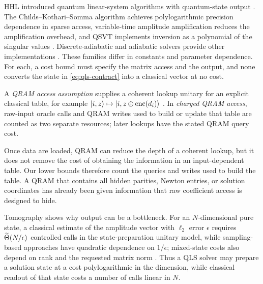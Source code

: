 HHL introduced quantum linear-system algorithms with quantum-state output
\cite{harrow2009-quantum-algorithm-linear-systems-equations}.  The
Childs--Kothari--Somma algorithm achieves polylogarithmic precision dependence
in sparse access, variable-time amplitude amplification reduces the
amplification overhead, and QSVT implements inversion as a polynomial of the
singular values
\cite{andrew2017-quantum-algorithm-systems-linear-equations,andris2012-variable-time-amplitude-amplification-quantum,andras2019-quantum-singular-value-transformation-beyond}.
Discrete-adiabatic and adiabatic solvers provide other implementations
\cite{luigi2022-optimal-scaling-quantum-linear-systems,subasi2019-adiabatic-quantum-linear-system}.
These families differ in constants and parameter dependence.  For each, a
cost bound must specify the matrix access and the output, and none converts
the state in \eqref{eq:qls-contract} into a classical vector at no cost.

\begin{definition}
\label{def:charged-qram}
A \emph{QRAM access assumption} supplies a coherent lookup unitary for an
explicit classical table, for example
$\lvert i,z\rangle\mapsto\lvert i,z\mathbin\oplus\operatorname{enc}(d_i)\rangle$
\cite{giovannetti2008-architectures-for-a-quantum-random}.
In \emph{charged QRAM access}, raw-input oracle calls and QRAM writes used to
build or update that table are counted as two separate resources; later
lookups have the stated QRAM query cost.
\end{definition}

Once data are loaded, QRAM can reduce the depth of a coherent lookup, but it
does not remove the cost of obtaining the information in an input-dependent
table.  Our lower bounds therefore count the queries and writes used to build
the table.  A QRAM that contains all hidden
parities, Newton entries, or solution coordinates has already been given
information that raw coefficient access is designed to hide.

Tomography shows why output can be a bottleneck.  For an $N$-dimensional pure
state, a classical estimate of the amplitude vector with $\ell_2$
error $\epsilon$ requires
$\widetilde{\Theta}(N/\epsilon)$ controlled calls in the state-preparation
unitary model, while sampling-based approaches have quadratic dependence on
$1/\epsilon$; mixed-state costs also depend on rank and the requested matrix
norm \cite{joran2023-quantum-tomography-state-preparation-unitaries}.  Thus a QLS
solver may prepare a solution state at a cost polylogarithmic in the
dimension, while classical readout of that state costs a number of calls
linear in $N$.

